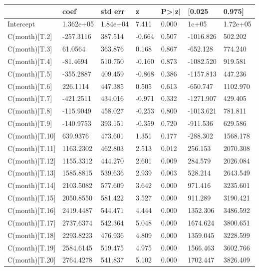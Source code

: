 \begin{tabular}{lllllll}
\toprule
 & coef & std err & z & P>|z| & [0.025 & 0.975] \\
\midrule
Intercept &  1.362e+05 &  1.84e+04 &     7.411 &  0.000 &     1e+05 &  1.72e+05 \\
C(month)[T.2] &  -257.3116 &   387.514 &    -0.664 &  0.507 & -1016.826 &   502.202 \\
C(month)[T.3] &    61.0564 &   363.876 &     0.168 &  0.867 &  -652.128 &   774.240 \\
C(month)[T.4] &   -81.4694 &   510.750 &    -0.160 &  0.873 & -1082.520 &   919.581 \\
C(month)[T.5] &  -355.2887 &   409.459 &    -0.868 &  0.386 & -1157.813 &   447.236 \\
C(month)[T.6] &   226.1114 &   447.385 &     0.505 &  0.613 &  -650.747 &  1102.970 \\
C(month)[T.7] &  -421.2511 &   434.016 &    -0.971 &  0.332 & -1271.907 &   429.405 \\
C(month)[T.8] &  -115.9049 &   458.027 &    -0.253 &  0.800 & -1013.621 &   781.811 \\
C(month)[T.9] &  -140.9753 &   393.151 &    -0.359 &  0.720 &  -911.536 &   629.586 \\
C(month)[T.10] &   639.9376 &   473.601 &     1.351 &  0.177 &  -288.302 &  1568.178 \\
C(month)[T.11] &  1163.2302 &   462.803 &     2.513 &  0.012 &   256.153 &  2070.308 \\
C(month)[T.12] &  1155.3312 &   444.270 &     2.601 &  0.009 &   284.579 &  2026.084 \\
C(month)[T.13] &  1585.8815 &   539.636 &     2.939 &  0.003 &   528.214 &  2643.549 \\
C(month)[T.14] &  2103.5082 &   577.609 &     3.642 &  0.000 &   971.416 &  3235.601 \\
C(month)[T.15] &  2050.8550 &   581.422 &     3.527 &  0.000 &   911.289 &  3190.421 \\
C(month)[T.16] &  2419.4487 &   544.471 &     4.444 &  0.000 &  1352.306 &  3486.592 \\
C(month)[T.17] &  2737.6374 &   542.364 &     5.048 &  0.000 &  1674.624 &  3800.651 \\
C(month)[T.18] &  2293.8223 &   476.936 &     4.809 &  0.000 &  1359.045 &  3228.599 \\
C(month)[T.19] &  2584.6145 &   519.475 &     4.975 &  0.000 &  1566.463 &  3602.766 \\
C(month)[T.20] &  2764.4278 &   541.837 &     5.102 &  0.000 &  1702.447 &  3826.409 \\

\end{tabular}
